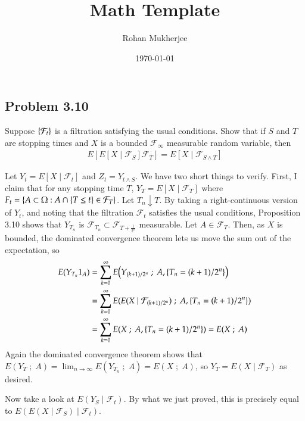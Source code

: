 \documentclass[12pt]{article}
\title{Math Template}
\date{\today}
\author{Rohan Mukherjee}
\theoremstyle{definitionstyle}
\newcommand{\SET}[1]{\Set{\mskip-\medmuskip #1 \mskip-\medmuskip}}
\newcommand{\1}{\mathds 1}
\begin{document}
    \maketitle
    \subsection*{Problem 3.10}
    Suppose $\SET{\mathcal F_t}$ is a filtration satisfying the usual conditions. Show that if $S$ and $T$ are stopping times and $X$ is a bounded $\mathcal F_\infty$ measurable random variable, then
    \begin{align*}
        E[E[X \mid \mathcal F_S] \mathcal F_T] = E[X \mid \mathcal F_{S \land T}]
    \end{align*}

    Let $Y_t = E[X \mid \mathcal F_t]$ and $Z_t = Y_{t \land S}$. We have two short things to verify. First, I claim that for any stopping time $T$, $Y_T = E[X \mid \mathcal F_T]$ where $F_t = \SET{A \subset \Omega : A \cap \SET{T \leq t} \in \mathcal F_T}$. Let $T_n \downarrow T$. By taking a right-continuous version of $Y_t$, and noting that the filtration $\mathcal F_t$ satisfies the usual conditions, Proposition 3.10 shows that $Y_{T_n}$ is $\mathcal F_{T_n} \subset \mathcal F_{T + \frac {1}{2^n}}$ measurable. Let $A \in \mathcal F_T$. Then, as $X$ is bounded, the dominated convergence theorem lets us move the sum out of the expectation, so
    \begin{align*}
        E(Y_{T_n} 1_A) &= \sum_{k=0}^\infty E\qty(Y_{(k+1)/2^n} \;;\; A, \SET{T_n = (k+1)/2^n}) \\
        &= \sum_{k=0}^\infty E(E(X \mid \mathcal F_{(k+1)/2^n}) \;;\; A, \SET{T_n = (k+1)/2^n}) \\
        &= \sum_{k=0}^\infty E(X \;;\; A, \SET{T_n = (k+1)/2^n}) = E(X \;;\; A)\\
    \end{align*}
    Again the dominated convergence theorem shows that $E(Y_T \;;\; A) = \lim_{n \to \infty} E(Y_{T_n} \;;\; A) = E(X \;;\; A)$, so $Y_T = E(X \mid \mathcal F_T)$ as desired.

    Now take a look at $E(Y_S \mid \mathcal F_t)$. By what we just proved, this is precisely equal to $E(E(X \mid \mathcal F_S) \mid \mathcal F_t)$. 
\end{document}
